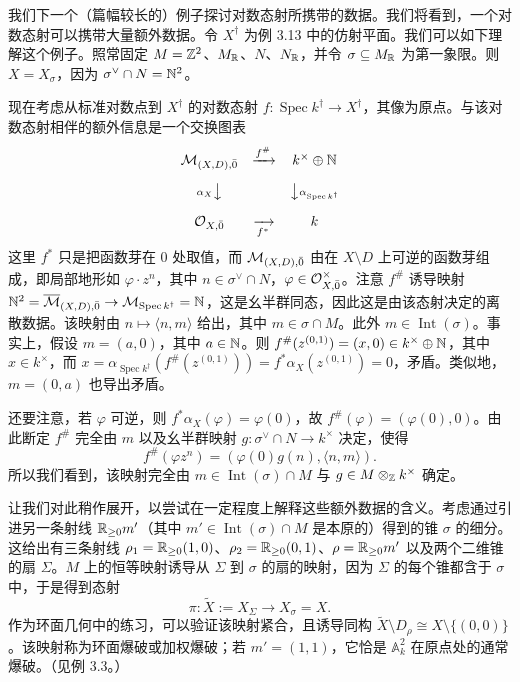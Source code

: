 \begin{example}
我们下一个（篇幅较长的）例子探讨对数态射所携带的数据。我们将看到，一个对数态射可以携带大量额外数据。令 $X^\dagger$ 为例 3.13 中的仿射平面。我们可以如下理解这个例子。照常固定 $M=\mathbb{Z}^2$、$M_{\mathbb{R}}$、$N$、$N_{\mathbb{R}}$，并令 $\sigma\subseteq M_{\mathbb{R}}$ 为第一象限。则 $X=X_\sigma$，因为 $\sigma^{\vee}\cap N=\mathbb{N}^2$。

现在考虑从标准对数点到 $X^\dagger$ 的对数态射 $f:\operatorname{Spec} k^\dagger\to X^\dagger$，其像为原点。与该对数态射相伴的额外信息是一个交换图表
\[
  \begin{array}{ccc}
    \mathcal{M}_{(X,D),\bar 0} & \xrightarrow{f^{\#}} & k^{\times}\oplus\mathbb{N}\\[10pt]
    {\scriptstyle\alpha_X}\big\downarrow & & \big\downarrow{\scriptstyle\alpha_{\operatorname{Spec}k^{\dagger}}}\\[10pt]
    \mathcal{O}_{X,\bar 0} & \xrightarrow[f^{*}]{} & k
  \end{array}
\]
这里 $f^*$ 只是把函数芽在 $0$ 处取值，而 $\mathcal{M}_{(X,D),\bar 0}$ 由在 $X\setminus D$ 上可逆的函数芽组成，即局部地形如 $\varphi\cdot z^n$，其中 $n\in\sigma^{\vee}\cap N$，$\varphi\in\mathcal{O}_{X,\bar 0}^{\times}$。注意 $f^{\#}$ 诱导映射 $\mathbb{N}^2=\overline{\mathcal{M}}_{(X,D),\bar 0}\to\mathcal{M}_{\operatorname{Spec}k^\dagger}=\mathbb{N}$，这是幺半群同态，因此这是由该态射决定的离散数据。该映射由 $n\mapsto\langle n,m\rangle$ 给出，其中 $m\in\sigma\cap M$。此外 $m\in\operatorname{Int}(\sigma)$。事实上，假设 $m=(a,0)$，其中 $a\in\mathbb{N}$。则 $f^{\#}(z^{(0,1)})=(x,0)\in k^{\times}\oplus\mathbb{N}$，其中 $x\in k^{\times}$，而 $x=\alpha_{\operatorname{Spec}k^\dagger}(f^{\#}(z^{(0,1)}))=f^*\alpha_X(z^{(0,1)})=0$，矛盾。类似地，$m=(0,a)$ 也导出矛盾。

还要注意，若 $\varphi$ 可逆，则 $f^*\alpha_X(\varphi)=\varphi(0)$，故 $f^{\#}(\varphi)=(\varphi(0),0)$。由此断定 $f^{\#}$ 完全由 $m$ 以及幺半群映射 $g:\sigma^{\vee}\cap N\to k^{\times}$ 决定，使得
\begin{equation}
  f^{\#}(\varphi z^n)=(\varphi(0)g(n),\langle n,m\rangle). \tag{3.3}
\end{equation}
所以我们看到，该映射完全由 $m\in\operatorname{Int}(\sigma)\cap M$ 与 $g\in M\otimes_{\mathbb{Z}} k^{\times}$ 确定。

让我们对此稍作展开，以尝试在一定程度上解释这些额外数据的含义。考虑通过引进另一条射线 $\mathbb{R}_{\ge 0}m'$（其中 $m'\in\operatorname{Int}(\sigma)\cap M$ 是本原的）得到的锥 $\sigma$ 的细分。这给出有三条射线 $\rho_1=\mathbb{R}_{\ge 0}(1,0)$、$\rho_2=\mathbb{R}_{\ge 0}(0,1)$、$\rho=\mathbb{R}_{\ge 0}m'$ 以及两个二维锥的扇 $\Sigma$。$M$ 上的恒等映射诱导从 $\Sigma$ 到 $\sigma$ 的扇的映射，因为 $\Sigma$ 的每个锥都含于 $\sigma$ 中，于是得到态射
\[
  \pi:\tilde X:=X_\Sigma\to X_\sigma=X.
\]
作为环面几何中的练习，可以验证该映射紧合，且诱导同构 $\tilde X\setminus D_\rho\cong X\setminus\{(0,0)\}$。该映射称为环面爆破或加权爆破；若 $m'=(1,1)$，它恰是 $\mathbb{A}^2_k$ 在原点处的通常爆破。（见例 3.3。）


\end{example}
